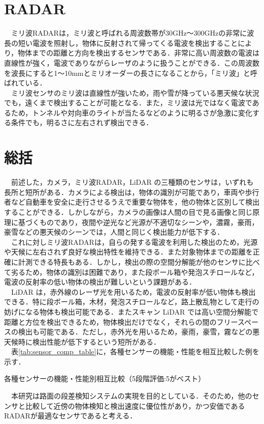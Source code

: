 \section{RADAR}
　ミリ波RADARは，ミリ波と呼ばれる周波数帯が30GHz～300GHzの非常に波長の短い電波を照射し，物体に反射されて帰ってくる電波を検出することにより，物体までの距離と方向を検出するセンサである．非常に高い周波数の電波は直線性が強く，電波でありながらレーザのように扱うことができる．この周波数を波長にすると1～10mmとミリオーダーの長さになることから，「ミリ波」と呼ばれている．\\
　ミリ波センサのミリ波は直線性が強いため，雨や雪が降っている悪天候な状況でも，遠くまで検出することが可能となる．また，ミリ波は光ではなく電波であるため，トンネルや対向車のライトが当たるなどのように明るさが急激に変化する条件でも，明るさに左右されず検出できる\cite{zmp_sensor}．

\section{総括}
　前述した，カメラ，ミリ波RADAR，LiDAR の三種類のセンサは，いずれも長所と短所がある．カメラによる検出は，物体の識別が可能であり，車両や歩行者など自動車を安全に走行させるうえで重要な物体を，他の物体と区別して検出することができる．しかしながら，カメラの画像は人間の目で見る画像と同じ原理に基づくものであり，夜間や逆光など光源が不適切なシーンや，濃霧，豪雨，豪雪などの悪天候のシーンでは，人間と同じく検出能力が低下する．\\
　これに対しミリ波RADARは，自らの発する電波を利用した検出のため，光源や天候に左右されず良好な検出特性を維持できる．また対象物体までの距離を正確に計測できる特長もある．しかし，検出の際の空間分解能が他のセンサに比べて劣るため，物体の識別は困難であり，また段ボール箱や発泡スチロールなど，電波の反射率の低い物体の検出が難しいという課題がある．\\
　LiDAR は，赤外線のレーザ光を用いるため，電波の反射率が低い物体も検出できる．特に段ボール箱，木材，発泡スチロールなど，路上散乱物として走行の妨げになる物体も検出可能である．またスキャン LiDAR では高い空間分解能で距離と方位を検出できるため，物体検出だけでなく，それらの間のフリースペースの検出も可能である．ただし，赤外光を用いるため，豪雨，豪雪，霧などの悪天候時に検出性能が低下するという短所がある．\\

　表\ref{tab:sensor_comp_table}に，各種センサーの機能・性能を相互比較した例を示す．

\begin{table}[H]
    \centering
    \caption{各種センサーの機能・性能別相互比較（5段階評価:5がベスト）\cite{cleantechnica_sensor}}
    
    \label{tab:sensor_comp_table}
\end{table}

　本研究は路面の段差検知システムの実現を目的としている．そのため，他のセンサと比較して近傍の物体検知と検出速度に優位性があり，かつ安価であるRADARが最適なセンサであると考える．
